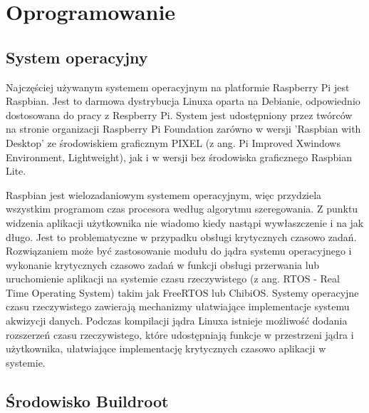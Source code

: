 \chapter{Oprogramowanie}
\label{ch:soft}

\section{System operacyjny}
Najczęściej używanym systemem operacyjnym na platformie Raspberry Pi jest Raspbian. Jest to
darmowa dystrybucja Linuxa oparta na Debianie, odpowiednio dostosowana do pracy z Respberry Pi. System jest udostępniony przez twórców na stronie organizacji \cite{raspfoundation} Raspberry Pi Foundation zarówno w wersji 'Raspbian with Desktop' ze środowiskiem graficznym PIXEL (z ang. Pi Improved Xwindows Environment, Lightweight), jak i w wersji bez środowiska graficznego Raspbian Lite.

Raspbian jest wielozadaniowym systemem operacyjnym, więc przydziela wszystkim programom czas procesora według algorytmu szeregowania. Z punktu widzenia aplikacji użytkownika nie wiadomo kiedy nastąpi wywłaszczenie i na jak długo. Jest to problematyczne w przypadku obsługi krytycznych czasowo zadań.
Rozwiązaniem może być zastosowanie modułu do jądra systemu operacyjnego i wykonanie krytycznych czasowo zadań w funkcji obsługi przerwania lub uruchomienie aplikacji na systemie czasu rzeczywistego (z ang. RTOS - Real Time Operating System) takim jak FreeRTOS lub ChibiOS. Systemy operacyjne czasu rzeczywistego zawierają mechanizmy ułatwiające implementacje systemu akwizycji danych. 
Podczas kompilacji jądra Linuxa istnieje możliwość dodania rozszerzeń czasu rzeczywistego, które udostępniają funkcje w przestrzeni jądra i użytkownika, ułatwiające implementację krytycznych czasowo aplikacji w systemie.

\section{Środowisko Buildroot}

